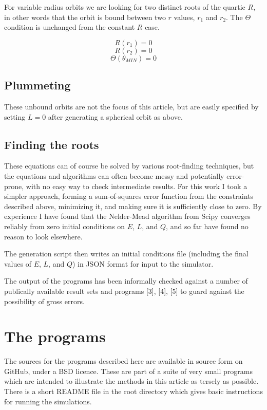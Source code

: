 \documentclass[11pt]{article}
\begin{document}
For variable radius orbits we are looking for two distinct roots of the quartic $R$, in other words that the orbit is bound between two $r$ values, $r_1$ and $r_2$.  The $\Theta$ condition is unchanged from the constant $R$ case.

$$
R(r_1) = 0
$$
$$
R(r_2) = 0
$$
$$
\Theta(\theta_{MIN}) = 0
$$

\subsection{Plummeting}

These unbound orbits are not the focus of this article, but are easily specified by setting $L = 0$ after generating a spherical orbit as above.

\subsection{Finding the roots}

These equations can of course be solved by various root-finding techniques, but the equations and algorithms can often become messy and potentially error-prone, with no easy way to check intermediate results.  For this work I took a simpler approach, forming a sum-of-squares error function from the constraints described above, minimizing it, and making sure it is sufficiently close to zero.  By experience I have found that the Nelder-Mead algorithm from Scipy converges reliably from zero initial conditions on $E$, $L$, and $Q$, and so far have found no reason to look elsewhere.

The generation script then writes an initial conditions file (including the final values of $E$, $L$, and $Q$) in JSON format for input to the simulator.

The output of the programs has been informally checked against a number of publically available result sets and programs [3], [4], [5] to guard against the possibility of gross errors.

\section{The programs}

The sources for the programs described here are available in source form on GitHub, under a BSD licence.  These are part of a suite of very small programs which are intended to illustrate the methods in this article as tersely as possible.  There is a short README file in the root directory which gives basic instructions for running the simulations.
\end{document}
